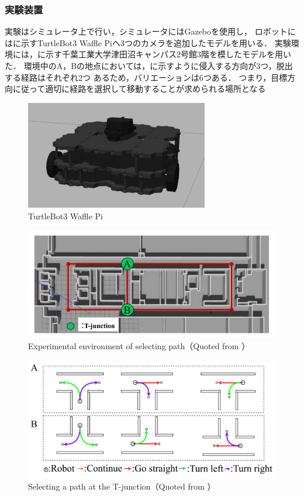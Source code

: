 \subsubsection{実験装置}
実験はシミュレータ上で行い，シミュレータにはGazebo\cite{Gazebo}を使用し，
ロボットにはに示すTurtleBot3 Waffle Pi\cite{ROBOTIS}へ3つのカメラを追加したモデルを用いる．
実験環境には，に示す千葉工業大学津田沼キャンパス2号館3階を模したモデルを用いた．
環境中のA，Bの地点においては，に示すように侵入する方向が3つ，脱出する経路はそれぞれ2つ
あるため，バリエーションは6つある．
つまり，目標方向に従って適切に経路を選択して移動することが求められる場所となる
\begin{figure}[htbp]
    \centering
     \includegraphics[width=80mm]{images/pdf/turtlebot3.pdf}
     \caption{TurtleBot3 Waffle Pi}
     \label{fig:turtlebot3}
\end{figure}
\begin{figure}[htbp]
    \centering
     \includegraphics[width=130mm]{images/pdf/haru_mech_exp.pdf}
     \caption[Experimental environment of selecting path]{Experimental environment of selecting path（Quoted from \cite{haruyama2022}）}
     \label{fig:haru_mech_exp}
\end{figure}
\begin{figure}[htbp]
    \centering
     \includegraphics[width=130mm]{images/pdf/haru_mech_exp_ab.pdf}
     \caption[Selecting a path at the T-junction]{Selecting a path at the T-junction（Quoted from \cite{haruyama2022}）}
     \label{fig:haru_mech_exp_ab}
\end{figure}
\vspace{-1zh}
